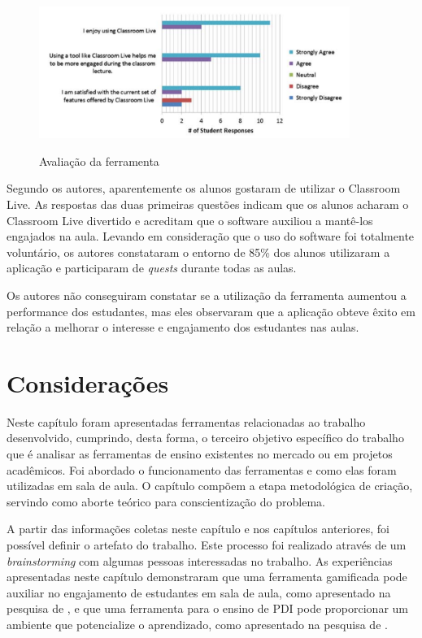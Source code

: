 \documentclass[
	12pt,				%
	oneside,			%
	a4paper,			%
	english,			%
	french,				%
	spanish,			%
	brazil,				%
	]{abntex2}
\begin{document}
\begin{figure}[ht]
\centering
\caption{Avaliação da ferramenta}
\includegraphics[width=0.9\textwidth]{imagens/classroom_avaliacao.png}
\label{fig:classroom_avaliacao}
\end{figure}

Segundo os autores, aparentemente os alunos gostaram de utilizar o Classroom Live. As respostas das duas primeiras questões indicam que os alunos acharam o Classroom Live divertido e acreditam que o software auxiliou a mantê-los engajados na aula. Levando em consideração que o uso do software foi totalmente voluntário, os autores constataram o entorno de 85\% dos alunos utilizaram a aplicação e participaram de \textit{quests} durante todas as aulas. 

Os autores não conseguiram constatar se a utilização da ferramenta aumentou a performance dos estudantes, mas eles observaram que a aplicação obteve êxito em relação a melhorar o interesse e engajamento dos estudantes nas aulas.

\section{Considerações}

Neste capítulo foram apresentadas ferramentas relacionadas ao trabalho desenvolvido, cumprindo, desta forma, o terceiro objetivo específico do trabalho que é analisar as ferramentas de ensino existentes no mercado ou em projetos acadêmicos. Foi abordado o funcionamento das ferramentas e como elas foram utilizadas em sala de aula. O capítulo compõem a etapa metodológica de criação, servindo como aborte teórico para conscientização do problema. 

A partir das informações coletas neste capítulo e nos capítulos anteriores, foi possível definir o artefato do trabalho. Este processo foi realizado através de um \textit{brainstorming} com algumas pessoas interessadas no trabalho. As experiências apresentadas neste capítulo demonstraram que uma ferramenta gamificada pode auxiliar no engajamento de estudantes em sala de aula, como apresentado na pesquisa de \citet{de2013classroom}, e que uma ferramenta para o ensino de PDI pode proporcionar um ambiente que potencialize o aprendizado, como apresentado na pesquisa de \citet{cazorla2015javavis}.
\end{document}
